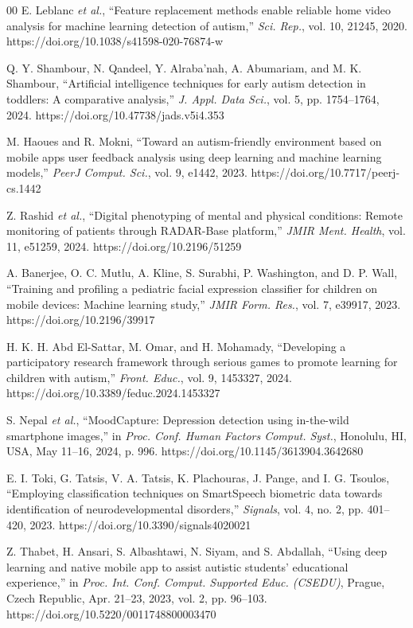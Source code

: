 \documentclass{ieeeaccess}
\begin{document}
\begin{thebibliography}{00}
		 E. Leblanc \emph{et al.}, ``Feature replacement methods enable reliable home video analysis for machine learning detection of autism,'' \emph{Sci. Rep.}, vol. 10, 21245, 2020. https://doi.org/10.1038/s41598-020-76874-w
		
		 Q. Y. Shambour, N. Qandeel, Y. Alraba'nah, A. Abumariam, and M. K. Shambour, ``Artificial intelligence techniques for early autism detection in toddlers: A comparative analysis,'' \emph{J. Appl. Data Sci.}, vol. 5, pp. 1754--1764, 2024. https://doi.org/10.47738/jads.v5i4.353
		
		 M. Haoues and R. Mokni, ``Toward an autism-friendly environment based on mobile apps user feedback analysis using deep learning and machine learning models,'' \emph{PeerJ Comput. Sci.}, vol. 9, e1442, 2023. https://doi.org/10.7717/peerj-cs.1442
		
		 Z. Rashid \emph{et al.}, ``Digital phenotyping of mental and physical conditions: Remote monitoring of patients through RADAR-Base platform,'' \emph{JMIR Ment. Health}, vol. 11, e51259, 2024. https://doi.org/10.2196/51259
		
		 A. Banerjee, O. C. Mutlu, A. Kline, S. Surabhi, P. Washington, and D. P. Wall, ``Training and profiling a pediatric facial expression classifier for children on mobile devices: Machine learning study,'' \emph{JMIR Form. Res.}, vol. 7, e39917, 2023. https://doi.org/10.2196/39917
		
		 H. K. H. Abd El-Sattar, M. Omar, and H. Mohamady, ``Developing a participatory research framework through serious games to promote learning for children with autism,'' \emph{Front. Educ.}, vol. 9, 1453327, 2024. https://doi.org/10.3389/feduc.2024.1453327
		
		 S. Nepal \emph{et al.}, ``MoodCapture: Depression detection using in-the-wild smartphone images,'' in \emph{Proc. Conf. Human Factors Comput. Syst.}, Honolulu, HI, USA, May 11--16, 2024, p. 996. https://doi.org/10.1145/3613904.3642680
		
		 E. I. Toki, G. Tatsis, V. A. Tatsis, K. Plachouras, J. Pange, and I. G. Tsoulos, ``Employing classification techniques on SmartSpeech biometric data towards identification of neurodevelopmental disorders,'' \emph{Signals}, vol. 4, no. 2, pp. 401--420, 2023. https://doi.org/10.3390/signals4020021
		
		 Z. Thabet, H. Ansari, S. Albashtawi, N. Siyam, and S. Abdallah, ``Using deep learning and native mobile app to assist autistic students' educational experience,'' in \emph{Proc. Int. Conf. Comput. Supported Educ. (CSEDU)}, Prague, Czech Republic, Apr. 21--23, 2023, vol. 2, pp. 96--103. https://doi.org/10.5220/0011748800003470
		

\end{thebibliography}
\end{document}
